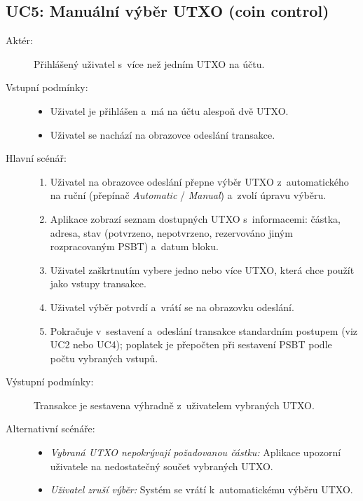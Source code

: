 \subsection{UC5: Manuální výběr UTXO (coin control)}
\label{uc:coin-control}

\begin{description}
  \item[Aktér:] Přihlášený uživatel s~více než jedním UTXO na účtu.
  \item[Vstupní podmínky:] \hfill
    \begin{itemize}
      \item Uživatel je přihlášen a~má na účtu alespoň dvě UTXO.
      \item Uživatel se nachází na obrazovce odeslání transakce.
    \end{itemize}
  \item[Hlavní scénář:] \hfill
    \begin{enumerate}
      \item Uživatel na obrazovce odeslání přepne výběr UTXO z~automatického
            na ruční (přepínač \emph{Automatic} / \emph{Manual}) a~zvolí úpravu
            výběru.
      \item Aplikace zobrazí seznam dostupných UTXO s~informacemi: částka,
            adresa, stav (potvrzeno, nepotvrzeno, rezervováno jiným
            rozpracovaným PSBT) a~datum bloku.
      \item Uživatel zaškrtnutím vybere jedno nebo více UTXO, která chce
            použít jako vstupy transakce.
      \item Uživatel výběr potvrdí a~vrátí se na obrazovku odeslání.
      \item Pokračuje v~sestavení a~odeslání transakce standardním postupem
            (viz UC2 nebo UC4); poplatek je přepočten při sestavení PSBT
            podle počtu vybraných vstupů.
    \end{enumerate}
  \item[Výstupní podmínky:] Transakce je sestavena výhradně z~uživatelem vybraných
    UTXO.
  \item[Alternativní scénáře:] \hfill
    \begin{itemize}
      \item \emph{Vybraná UTXO nepokrývají požadovanou částku:} Aplikace upozorní
            uživatele na nedostatečný součet vybraných UTXO.
      \item \emph{Uživatel zruší výběr:} Systém se vrátí k~automatickému výběru UTXO.
    \end{itemize}
\end{description}

